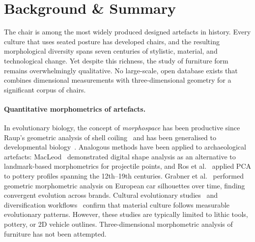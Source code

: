 \section{Background \& Summary}

The chair is among the most widely produced designed artefacts in history.
Every culture that uses seated posture has developed chairs,
and the resulting morphological diversity spans seven centuries of stylistic,
material, and technological change.
Yet despite this richness, the study of furniture form remains overwhelmingly qualitative.
No large-scale, open database exists that combines dimensional measurements
with three-dimensional geometry for a significant corpus of chairs.

\paragraph{Quantitative morphometrics of artefacts.}
In evolutionary biology, the concept of \emph{morphospace}
has been productive since Raup's geometric analysis of shell coiling~\cite{raup1966geometric}
and has been generalised to developmental biology~\cite{mitteroecher2009morphospace}.
Analogous methods have been applied to archaeological artefacts:
MacLeod~\cite{macleod2018quantitative} demonstrated digital shape analysis
as an alternative to landmark-based morphometrics for projectile points,
and Ros et al.~\cite{pottery2022morphometrics} applied PCA to pottery profiles
spanning the 12th--19th centuries.
Grabner et al.~\cite{grabner2015automotive} performed geometric morphometric analysis
on European car silhouettes over time, finding convergent evolution across brands.
Cultural evolutionary studies~\cite{lycett2016cultural,mesoudi2011cultural,shennan2015cultural}
and diversification workflows~\cite{kandler2019diversification}
confirm that material culture follows measurable evolutionary patterns.
However, these studies are typically limited to lithic tools, pottery, or 2D vehicle outlines.
Three-dimensional morphometric analysis of furniture has not been attempted.

